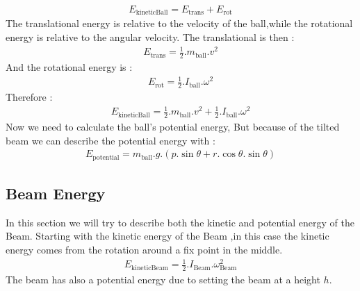 \documentclass{article}
\begin{document}
\begin{equation}
	\begin{split}
		E_{\text{kineticBall}} = E_{\text{trans}} + E_{\text{rot}}
	\end{split}
\end{equation}
The translational energy is relative to the velocity of the ball,while the rotational energy is relative to the angular velocity.
The translational is then :
\begin{equation}
	\begin{split}
		E_{\text{trans}} = \frac{1}{2}.m_{\text{ball}}.v^2
	\end{split}	
\end{equation}
And the rotational energy is :
\begin{equation}
	\begin{split}
		E_{\text{rot}} = \frac{1}{2}.I_{\text{ball}}.\omega^2
	\end{split}
\end{equation}
Therefore :
\begin{equation}\label{kineticBall}
	\begin{split}
		E_{\text{kineticBall}} =\frac{1}{2}.m_{\text{ball}}.v^2 + \frac{1}{2}.I_{\text{ball}}.\omega^2
	\end{split}
\end{equation}
Now we need to calculate the ball's potential energy, 
But because of the tilted beam we can describe the potential energy with :
\begin{equation}
	\begin{split}\label{potential}
		E_{\text{potential}} = m_{\text{ball}}.g.(p.\sin{\theta} + r.\cos{\theta}.\sin{\theta})
	\end{split}
\end{equation}


\newpage
\subsection{Beam Energy}
\noindent In this section we will try to describe both the kinetic and potential energy of the Beam.
Starting with the kinetic energy of the Beam ,in this case the kinetic energy comes from the rotation around a fix point in the
middle.
\begin{equation}\label{kineticBeam}
	\begin{split}
		E_{\text{kineticBeam}} = \frac{1}{2}.I_{\text{Beam}}.\omega_{\text{Beam}}^2
	\end{split}	
\end{equation}
\noindent The beam has also a potential energy due to setting the beam at a height $h$.
\end{document}
